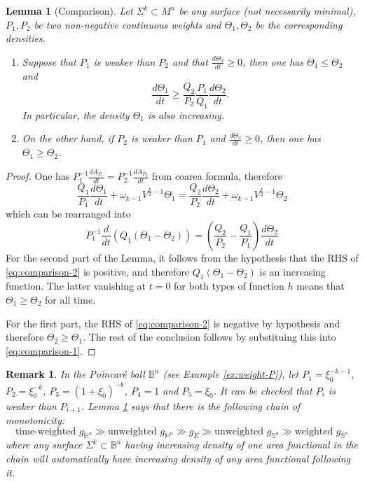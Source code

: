 \documentclass[11pt]{article}
\newtheorem{remark}[theorem]{Remark}
\newtheorem{lemma}[theorem]{Lemma}
\begin{document}
\begin{lemma}[Comparison]
\label{lem:comparison}
Let \(\Sigma^k\subset M^n\) be any surface (not necessarily minimal), \(P_1, P_2\) be
two non-negative continuous
weights and \(\Theta_1,\Theta_2\) be the corresponding densities.

\begin{enumerate}
\item Suppose that \(P_1\) is weaker than \(P_2\) and that \(\frac{d\Theta_2}{dt}\geq 0\), then one has \(\Theta_1\leq\Theta_2\) and 
\[ 
   \frac{d\Theta_1}{dt} \geq \frac{Q_2}{P_2}\frac{P_1}{Q_1}
   \frac{d\Theta_2}{dt}.
   \]
In particular, the density \(\Theta_1\) is also increasing.
\item On the other hand, if \(P_2\) is weaker than \(P_1\) and \(\frac{d\Theta_2}{dt}\geq 0\), then one has \(\Theta_1\geq\Theta_2\).
\end{enumerate}
\end{lemma}
\begin{proof}
One has \(P_1^{-1} \frac{dA_{P_1}}{dt} = P_2^{-1}\frac{dA_{P_2}}{dt}\) from coarea
formula, therefore
\begin{equation}
\label{eq:comparison-1}
\frac{Q_1}{P_1}\frac{d\Theta_1}{dt} + \omega_{k-1}V^{\frac{k}{2}-1}\Theta_1 = \frac{Q_2}{P_2}\frac{d\Theta_2}{dt} + \omega_{k-1}V^{\frac{k}{2}-1}\Theta_2
\end{equation}
which can be rearranged into
\begin{equation}
\label{eq:comparison-2}
P_1^{-1} \frac{d}{dt}\left( Q_1(\Theta_1 -\Theta_2) \right) = \left(\frac{Q_2}{P_2}-\frac{Q_1}{P_1}\right) \frac{d\Theta_2}{dt}
\end{equation}
For the second part of the Lemma, it follows from the hypothesis  that the RHS of
\eqref{eq:comparison-2} is positive, and therefore \(Q_1(
\Theta_1- \Theta_2)\) is an increasing function. The latter vanishing at \(t=0\) for both types of function \(h\) means that \(\Theta_1\geq\Theta_2\)
for all time.

For the first part, the RHS of \eqref{eq:comparison-2} is negative by hypothesis and
 therefore \(\Theta_2 \geq \Theta_1\). The rest of the conclusion follows by substituing this into \eqref{eq:comparison-1}.
\end{proof}


\begin{remark}
\label{rem:comparison}
In the Poincaré ball \(\mathbb{B}^n\) (see Example \ref{ex:weight-P}), let 
   \(P_1 = \xi_0^{-k-1}\), \(P_2 =\xi_0^{-k}\), \(P_3 = (1+\xi_0)^{-k}\), \(P_4=1\) and \(P_5=\xi_0\). It can be checked that \(P_i\) is weaker than \(P_{i+1}\). Lemma
   \ref{lem:comparison} says that there is the following chain of monotonicity:
\begin{equation}
\label{eq:chain}
\text{time-weighted }  g_{\mathbb{H}^n} \gg   \text{unweighted } g_{\mathbb{H}^n}
\gg g_E  \gg \text{unweighted } g_{\mathbb{S}^n}   \gg \text{weighted } g_{\mathbb{S}^n} 
\end{equation}
where any surface \(\Sigma^k\subset \mathbb{B}^n\) having increasing density of one area
functional in the chain will automatically have increasing density of any area functional
following it.
\end{remark}
\end{document}
